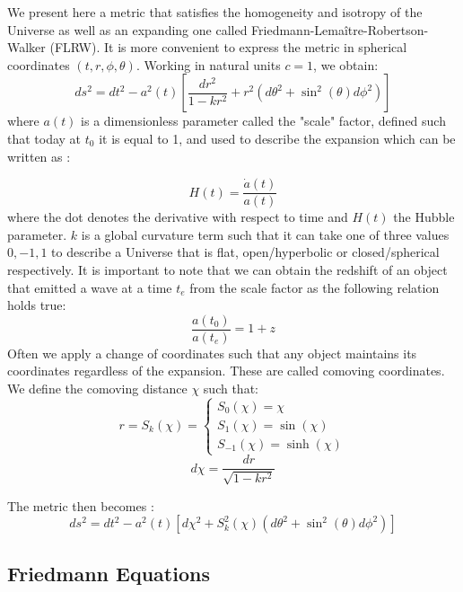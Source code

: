 We present here a metric that satisfies the homogeneity and isotropy of the Universe as well as an expanding one called Friedmann-Lemaître-Robertson-Walker (FLRW). It is more convenient 
to express the metric in spherical coordinates $(t, r, \phi, \theta)$. Working in natural units $c=1$, we obtain:
\begin{equation}
    ds^2 = dt^2 - a^2(t)\left[ \frac{dr^2}{1-kr^2} + r^2(d\theta^2 + \sin^2(\theta)d\phi^2) \right]
\end{equation}
where $a(t)$ is a dimensionless parameter called the "scale" factor, defined such that today at $t_0$ it is equal to 1, and used to describe the expansion which can be written as :

\begin{equation}
    H(t) = \frac{\dot{a}(t)}{a(t)}
\end{equation}
where the dot denotes the derivative with respect to time and $H(t)$ the Hubble parameter. 
$k$ is a global curvature term such that it can take one of three values $0,-1,1$ to describe a Universe that is flat, open/hyperbolic or closed/spherical respectively.
It is important to note that we can obtain the redshift of an object that emitted a wave at a time $t_e$ from the scale factor as the following relation holds true:
\begin{equation}
    \frac{a(t_0)}{a(t_e)} = 1+z
\end{equation}
Often we apply a change of coordinates such that any object maintains its coordinates regardless of the expansion. These are called comoving coordinates. We define the 
comoving distance $\chi$ such that:
\begin{equation}
    r = S_k(\chi) = \begin{cases}
        S_0(\chi) = \chi \\
        S_{1}(\chi) = \sin(\chi) \\
        S_{-1}(\chi) = \sinh(\chi)
    \end{cases}
\end{equation}
\begin{equation}
    d\chi = \frac{dr}{\sqrt{1-kr^2}}
\end{equation}

The metric then becomes : 
\begin{equation}
    ds^2 = dt^2 - a^2(t)\left[ d\chi^2 + S_k^2(\chi) (d\theta^2 + \sin^2(\theta)d\phi^2) \right]
\end{equation}

\subsection{Friedmann Equations}

